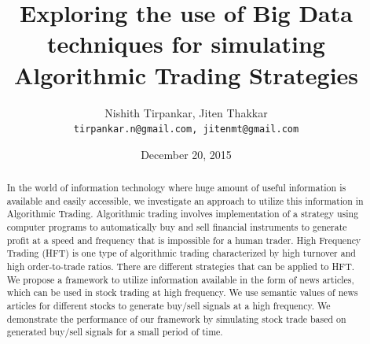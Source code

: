 \documentclass[a4paper,11pt]{article}
\title{Exploring the use of Big Data techniques for simulating Algorithmic Trading Strategies}
\author{Nishith Tirpankar, Jiten Thakkar\\
\texttt{tirpankar.n@gmail.com, jitenmt@gmail.com}}
\date{December 20, 2015}
\begin{document}
\maketitle
\thispagestyle{empty}
\begin{abstract}
In the world of information technology where huge amount of useful information is available and easily accessible, we investigate an approach to utilize this information in Algorithmic Trading. Algorithmic trading involves implementation of a strategy using computer programs to automatically buy and sell financial instruments to generate profit at a speed and frequency that is impossible for a human trader. High Frequency Trading (HFT) is one type of algorithmic trading characterized by high turnover and high order-to-trade ratios. There are different strategies that can be applied to HFT. We propose a framework to utilize information available in the form of news articles, which can be used in stock trading at high frequency. We use semantic values of news articles for different stocks to generate buy/sell signals at a high frequency. We demonstrate the performance of our framework by simulating stock trade based on generated buy/sell signals for a small period of time. 
\end{abstract}

\newpage
\tableofcontents
\thispagestyle{plain}
\setcounter{page}{1}
\newpage
\end{document}
